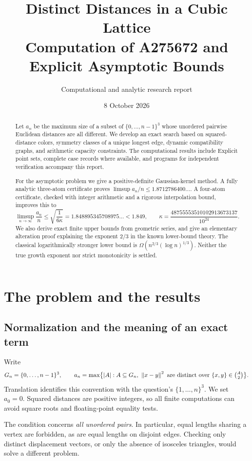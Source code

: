 \documentclass[11pt,letterpaper]{article}
\title{\color{ink}\bfseries Distinct Distances in a Cubic Lattice\\[5pt]
 \large Computation of A275672 and Explicit Asymptotic Bounds}
\author{Computational and analytic research report}
\date{8 October 2026}
\theoremstyle{definition}
\newcommand{\norm}[1]{\left\lVert #1\right\rVert}
\begin{document}
\maketitle
\begin{abstract}
Let \(a_n\) be the maximum size of a subset of
\(\{0,\ldots,n-1\}^3\) whose unordered pairwise Euclidean distances are all
different. We develop an exact search based on squared-distance colors,
symmetry classes of a unique longest edge, dynamic compatibility graphs,
and arithmetic capacity constraints. The computational results include
\AbstractComputation{}
Explicit point sets, complete case records where available, and programs
for independent verification accompany this report.

For the asymptotic problem we give a positive-definite Gaussian-kernel
method. A fully analytic three-atom certificate proves
\(\limsup a_n/n\le 1.8712786400\ldots\). A four-atom certificate, checked
with integer arithmetic and a rigorous interpolation bound, improves this to
\[
 \limsup_{n\to\infty}\frac{a_n}{n}
 \le \sqrt{\frac{1}{6\kappa}}
 =1.848895345708975\ldots<1.849,\qquad
 \kappa=\frac{48755553510102913673137}{10^{24}}.
\]
We also derive exact finite upper bounds from geometric series, and give
an elementary alteration proof explaining the exponent \(2/3\) in the
known lower-bound theory. The classical logarithmically stronger lower bound is
\(\Omega(n^{2/3}(\log n)^{1/3})\). Neither the true growth exponent nor
strict monotonicity is settled.
\end{abstract}

\newpage
{\footnotesize\tableofcontents}
\newpage

\section{The problem and the results}
\label{sec:intro}

\subsection{Normalization and the meaning of an exact term}
Write
\[
 G_n=\{0,\ldots,n-1\}^3,\qquad
 a_n=\max\bigl\{|A|:A\subseteq G_n,\ 
 \norm{x-y}^2\text{ are distinct over }\{x,y\}\in\tbinom A2\bigr\}.
\]
Translation identifies this convention with the question's
\(\{1,\ldots,n\}^3\). We set \(a_0=0\). Squared distances are positive
integers, so all finite computations can avoid square roots and
floating-point equality tests.

The condition concerns \emph{all unordered pairs}. In particular, equal
lengths sharing a vertex are forbidden, as are equal lengths on disjoint
edges. Checking only distinct displacement vectors, or only the absence of
isosceles triangles, would solve a different problem.
\end{document}
